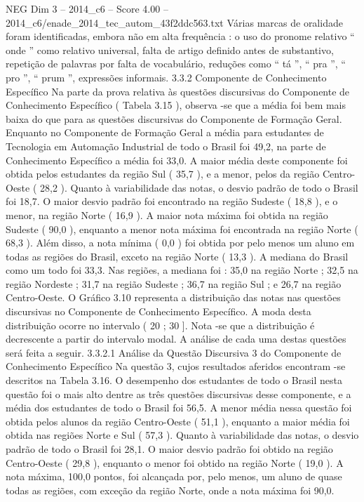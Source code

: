 \begin{textsample}{NEG Dim 3 – 2014\_c6 – Score 4.00 – 2014\_c6/enade\_2014\_tec\_autom\_43f2ddc563.txt}
Várias marcas de oralidade foram identificadas, embora não em alta frequência : o uso do pronome relativo “ onde ” como relativo universal, falta de artigo definido antes de substantivo, repetição de palavras por falta de vocabulário, reduções como “ tá ”, “ pra ”, “ pro ”, “ prum ”, expressões informais. 3.3.2 Componente de Conhecimento Específico Na parte da prova relativa às questões discursivas do Componente de Conhecimento Específico ( Tabela 3.15 ), observa -se que a média foi bem mais baixa do que para as questões discursivas do Componente de Formação Geral.
Enquanto no Componente de Formação Geral a média para estudantes de Tecnologia em Automação Industrial de todo o Brasil foi 49,2, na parte de Conhecimento Específico a média foi 33,0.
A maior média deste componente foi obtida pelos estudantes da região Sul ( 35,7 ), e a menor, pelos da região Centro-Oeste ( 28,2 ).
Quanto à variabilidade das notas, o desvio padrão de todo o Brasil foi 18,7.
O maior desvio padrão foi encontrado na região Sudeste ( 18,8 ), e o menor, na região Norte ( 16,9 ).
A maior nota máxima foi obtida na região Sudeste ( 90,0 ), enquanto a menor nota máxima foi encontrada na região Norte ( 68,3 ).
Além disso, a nota mínima ( 0,0 ) foi obtida por pelo menos um aluno em todas as regiões do Brasil, exceto na região Norte ( 13,3 ).
A mediana do Brasil como um todo foi 33,3.
Nas regiões, a mediana foi : 35,0 na região Norte ; 32,5 na região Nordeste ; 31,7 na região Sudeste ; 36,7 na região Sul ; e 26,7 na região Centro-Oeste.
O Gráfico 3.10 representa a distribuição das notas nas questões discursivas no Componente de Conhecimento Específico.
A moda desta distribuição ocorre no intervalo ( 20 ; 30 ].
Nota -se que a distribuição é decrescente a partir do intervalo modal.
A análise de cada uma destas questões será feita a seguir. 3.3.2.1 Análise da Questão Discursiva 3 do Componente de Conhecimento Específico Na questão 3, cujos resultados aferidos encontram -se descritos na Tabela 3.16.
O desempenho dos estudantes de todo o Brasil nesta questão foi o mais alto dentre as três questões discursivas desse componente, e a média dos estudantes de todo o Brasil foi 56,5.
A menor média nessa questão foi obtida pelos alunos da região Centro-Oeste ( 51,1 ), enquanto a maior média foi obtida nas regiões Norte e Sul ( 57,3 ).
Quanto à variabilidade das notas, o desvio padrão de todo o Brasil foi 28,1.
O maior desvio padrão foi obtido na região Centro-Oeste ( 29,8 ), enquanto o menor foi obtido na região Norte ( 19,0 ).
A nota máxima, 100,0 pontos, foi alcançada por, pelo menos, um aluno de quase todas as regiões, com exceção da região Norte, onde a nota máxima foi 90,0.

\end{textsample}
